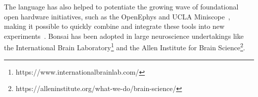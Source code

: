 The language has also helped to potentiate the growing wave of foundational
open hardware initiatives, such as the OpenEphys \citep{siegleEtAl17} and UCLA
Miniscope~\citep{caiEtAl16}, making it possible to quickly combine and
integrate these tools into new experiments~\citep{buccinoEtAl18}.
%
Bonsai has been adopted in large neuroscience undertakings like the
International Brain
Laboratory\footnote{https://www.internationalbrainlab.com/}
and the Allen Institute for Brain
Science\footnote{https://alleninstitute.org/what-we-do/brain-science/}.
%


